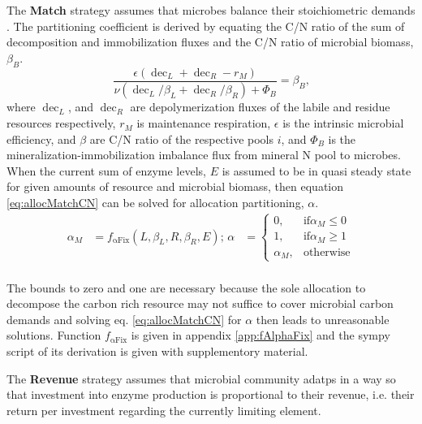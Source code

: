 The \textbf{Match} strategy assumes that microbes balance their stoichiometric
demands \citep{Moorhead12}. The partitioning coefficient is derived by equating
the C/N ratio of the sum of decomposition and immobilization fluxes and the C/N
ratio of microbial biomass, $\beta_B$. 
\begin{equation} 
\label{eq:allocMatchCN}
\frac{\epsilon (\operatorname{dec}_L + \operatorname{dec}_R - r_M)}{
\nu (\operatorname{dec}_L/\beta_L + \operatorname{dec}_R/\beta_R)  +
\Phi_{B} } =
\beta_B
\text{,}
\end{equation}
where $\operatorname{dec}_L$, and $\operatorname{dec}_R$ are 
depolymerization fluxes of the labile and residue resources
respectively, $r_M$ is maintenance respiration, $\epsilon$ is the 
intrinsic microbial efficiency, and $\beta$ are C/N ratio of
the respective pools $i$, and $\Phi_B$ is the mineralization-immobilization
imbalance flux from mineral N pool to microbes.
When the current sum of enzyme levels, $E$ is assumed to be in quasi steady
state for given amounts of resource and microbial biomass, then equation
\ref{eq:allocMatchCN} can be solved for allocation partitioning, $\alpha$.
\begin{subequations}
\label{eq:allocMatch} 
\begin{align}
\alpha_M &= f_{\operatorname{{\alpha}Fix}}(L,\beta_L,R,\beta_R, E); \,
\alpha &= \begin{cases}
  0,  & \text{if} \alpha_M \le 0 \\
  1,  & \text{if} \alpha_M \ge 1 \\
  \alpha_M, & \text{otherwise}
\end{cases} \\  
\end{align}
\end{subequations}

The bounds to zero and one are necessary because the sole
allocation to decompose the carbon rich resource may not suffice to
cover microbial carbon demands and solving eq. \ref{eq:allocMatchCN} for
$\alpha$ then leads to unreasonable solutions.
Function $f_{\operatorname{{\alpha}Fix}}$ is given in appendix
\ref{app:fAlphaFix} and the sympy script of its 
derivation is given with supplementory material. 

The \textbf{Revenue} strategy assumes that microbial community adatps in a way
so that investment into enzyme production is proportional to their revenue, i.e.
their return per investment regarding the currently limiting element.

